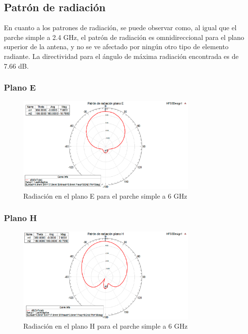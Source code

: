 \subsection{Patrón de radiación}
\par En cuanto a los patrones de radiación, se puede observar como, al igual que el parche simple a 2.4 GHz, el patrón de radiación es omnidireccional para el plano superior de la antena, y no se ve afectado por ningún otro tipo de elemento radiante. La directividad para el ángulo de máxima radiación encontrada es de 7.66 dB.
\\
\subsubsection{Plano E}
\begin{figure}[H]
    \centering
        \includegraphics[width=0.8\textwidth]{archivos/analisis/1x12/4}
        \caption{Radiación en el plano E para el parche simple a 6 GHz}
        \label{fig:E1x12}
\end{figure}

\subsubsection{Plano H}
\begin{figure}[H]
    \centering
        \includegraphics[width=0.8\textwidth]{archivos/analisis/1x12/5}
        \caption{Radiación en el plano H para el parche simple a 6 GHz}
        \label{fig:H1x12}
\end{figure}

